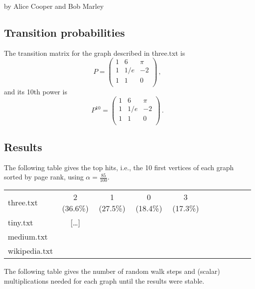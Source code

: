 \documentclass{tufte-handout}
\begin{document}
by Alice Cooper and Bob Marley

\subsection{Transition probabilities}

The transition matrix for the graph described in three.txt
is
\begin{equation*}
P = 
\left(
\begin{array}{ccc}
1 & 6 & \pi \\
1 & 1/e & -2 \\
1 & 1 & 0 \\
\end{array}
\right)\,,
\end{equation*}
and its 10th power is
\begin{equation*}
P^{10} = 
\left(
\begin{array}{ccc}
1 & 6 & \pi \\
1 & 1/e & -2 \\
1 & 1 & 0 \\
\end{array}
\right)\,.
\end{equation*}

\subsection{Results}

The following table gives the top hits, i.e., the 10 first vertices of
each graph sorted by page rank, using $\alpha = \frac{85}{100}$.

\medskip
\begin{fullwidth}
\small
\begin{tabular}{lcccccccccc}
three.txt & 2 (36.6\%) & 1 (27.5\%) & 0 (18.4\%) & 3 (17.3\%) \\
tiny.txt & [\ldots] &\\
medium.txt &\\
wikipedia.txt & \\
\end{tabular}
\end{fullwidth}

\bigskip The following table gives the number of random walk steps and
(scalar) multiplications needed for each graph until the results were
stable.
\end{document}
